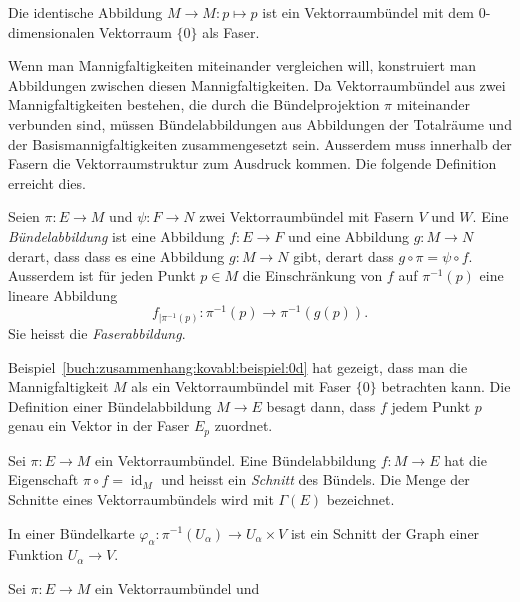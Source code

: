 \begin{beispiel}
\label{buch:zusammenhang:kovabl:beispiel:0d}
Die identische Abbildung $M\to M:p\mapsto p$ ist ein Vektorraumbündel
mit dem 0-dimensionalen Vektorraum $\{0\}$ als Faser.
\end{beispiel}

Wenn man Mannigfaltigkeiten miteinander vergleichen will, konstruiert
man Abbildungen zwischen diesen Mannigfaltigkeiten.
Da Vektorraumbündel aus zwei Mannigfaltigkeiten bestehen, die durch
die Bündelprojektion $\pi$ miteinander verbunden sind, müssen
Bündelabbildungen aus Abbildungen der Totalräume und der
Basismannigfaltigkeiten zusammengesetzt sein.
Ausserdem muss innerhalb der Fasern die Vektorraumstruktur zum
Ausdruck kommen.
Die folgende Definition erreicht dies.

\begin{definition}[Bündelabbildung]
Seien $\pi\colon E \to M$ und $\psi\colon F\to N$ zwei Vektorraumbündel
mit Fasern $V$ und $W$.
Eine \emph{Bündelabbildung} ist eine Abbildung $f\colon E\to F$ und
eine Abbildung $g\colon M\to N$ derart, dass
dass es eine Abbildung $g\colon M\to N$ gibt, derart dass 
$g\circ\pi=\psi\circ f$.
Ausserdem ist für jeden Punkt $p\in M$ die Einschränkung von $f$ auf
$\pi^{-1}(p)$ eine lineare Abbildung
\[
f_{|\pi^{-1}(p)}
\colon
\pi^{-1}(p)
\to
\pi^{-1}(g(p)).
\]
Sie heisst die \emph{Faserabbildung}.
\end{definition}

\begin{beispiel}
Beispiel~\ref{buch:zusammenhang:kovabl:beispiel:0d} hat gezeigt, dass
man die Mannigfaltigkeit $M$ als ein Vektorraumbündel mit Faser $\{0\}$
betrachten kann.
Die Definition einer Bündelabbildung $M\to E$ besagt dann, dass 
$f$ jedem Punkt $p$ genau ein Vektor in der Faser $E_p$ zuordnet.
\end{beispiel}

\begin{definition}
Sei $\pi\colon E\to M$ ein Vektorraumbündel.
Eine Bündelabbildung $f\colon M\to E$ hat die Eigenschaft
$\pi\circ f=\operatorname{id}_M$ und heisst ein \emph{Schnitt}
des Bündels.
Die Menge der Schnitte eines Vektorraumbündels wird mit $\Gamma(E)$
bezeichnet.
\end{definition}

In einer Bündelkarte $\varphi_\alpha:\pi^{-1}(U_\alpha) \to U_\alpha\times V$
ist ein Schnitt der Graph einer Funktion $U_\alpha\to V$.

\begin{beispiel}
Sei $\pi\colon E\to M$ ein Vektorraumbündel und 
\end{beispiel}


